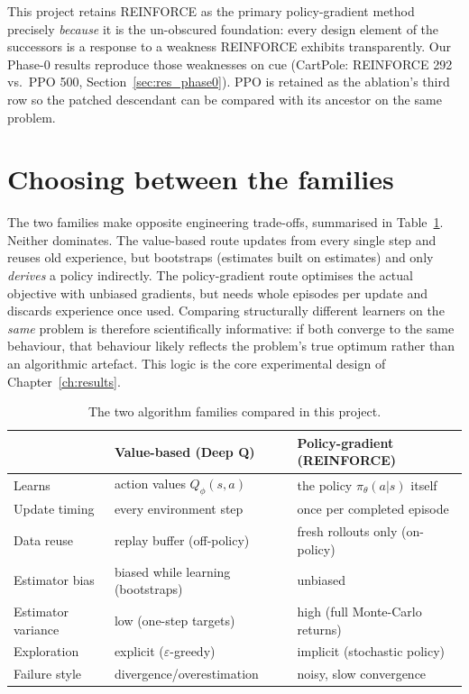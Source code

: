 This project retains REINFORCE as the primary policy-gradient method
precisely \emph{because} it is the un-obscured foundation: every design
element of the successors is a response to a weakness REINFORCE exhibits
transparently. Our Phase-0 results reproduce those weaknesses on cue
(CartPole: REINFORCE 292 vs.\ PPO 500,
Section~\ref{sec:res_phase0}). PPO is retained as the ablation's third
row so the patched descendant can be compared with its ancestor on the
same problem.

\section{Choosing between the families}
\label{sec:bg_families}

The two families make opposite engineering trade-offs, summarised in
Table~\ref{tab:bg_families}. Neither dominates. The value-based route
updates from every single step and reuses old experience, but bootstraps
(estimates built on estimates) and only \emph{derives} a policy
indirectly. The policy-gradient route optimises the actual objective with
unbiased gradients, but needs whole episodes per update and discards
experience once used. Comparing structurally different learners on the
\emph{same} problem is therefore scientifically informative: if both
converge to the same behaviour, that behaviour likely reflects the
problem's true optimum rather than an algorithmic artefact. This logic is
the core experimental design of Chapter~\ref{ch:results}.

\begin{table}[h]
\centering
\caption{The two algorithm families compared in this project.}
\label{tab:bg_families}
\small
\begin{tabular}{lll}
\toprule
 & \textbf{Value-based (Deep Q)} & \textbf{Policy-gradient (REINFORCE)} \\
\midrule
Learns            & action values $Q_\phi(s,a)$ & the policy $\pi_\theta(a|s)$ itself \\
Update timing     & every environment step      & once per completed episode \\
Data reuse        & replay buffer (off-policy)  & fresh rollouts only (on-policy) \\
Estimator bias    & biased while learning (bootstraps) & unbiased \\
Estimator variance& low (one-step targets)      & high (full Monte-Carlo returns) \\
Exploration       & explicit ($\varepsilon$-greedy) & implicit (stochastic policy) \\
Failure style     & divergence/overestimation   & noisy, slow convergence \\
\bottomrule
\end{tabular}
\end{table}

